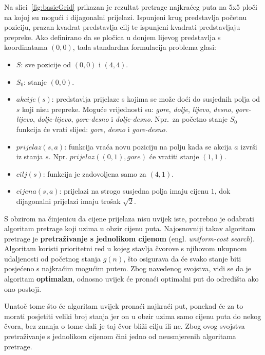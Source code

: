 \documentclass[times, utf8, zavrsni, numeric]{fer}
\begin{document}
Na slici~\ref{fig:basicGrid} prikazan je rezultat pretrage najkraćeg puta na 5x5 ploči na kojoj su mogući i dijagonalni prijelazi.
Ispunjeni krug predstavlja početnu poziciju, prazan kvadrat predstavlja cilj te ispunjeni kvadrati predstavljaju prepreke.
Ako definirano da se pločica u donjem lijevog predstavlja s koordinatama \((0, 0)\), tada standardna formulacija problema glasi:
\begin{itemize}
    \item \(S\): sve pozicije od \((0, 0)\) i \((4, 4)\).
    \item \(S_0\): stanje \((0, 0)\).
    \item \(akcije(s)\): predstavlja prijelaze s kojima se može doći do susjednih polja od \(s\) koji nisu prepreke. 
    Moguće vrijednosti su: \textit{gore}, \textit{dolje}, \textit{lijevo}, \textit{desno}, \textit{gore-lijevo}, \textit{dolje-lijevo}, \textit{gore-desno} i \textit{dolje-desno}. 
    Npr.\ za početno stanje \(S_0\) funkcija će vrati slijed: \textit{gore}, \textit{desno} i \textit{gore-desno}. 
    \item \(prijelaz(s, a)\): funkcija vraća novu poziciju na polju kada se akcija \(a\) izvrši iz stanja \(s\). Npr. \(prijelaz((0, 1), gore)\) će vratiti stanje \((1, 1)\).
    \item \(cilj(s)\): funkcija je zadovoljena samo za \((4, 1)\).
    \item \(cijena(s, a)\): prijelazi na strogo susjedna polja imaju cijenu \(1\), dok dijagonalni prijelazi imaju trošak \(\sqrt{2}\).
\end{itemize}

\par S obzirom na činjenicu da cijene prijelaza nisu uvijek iste, potrebno je odabrati algoritam pretrage koji uzima u obzir cijenu puta.
Najosnovniji takav algoritam pretrage je \textbf{pretraživanje s jednolikom cijenom} (engl. \textit{uniform-cost search}). 
Algoritam koristi prioritetni red u kojeg stavlja čvorove s njihovom ukupnom udaljenosti od početnog stanja \(g(n)\), što osigurava da će svako stanje biti posjećeno s najkraćim mogućim putem.
Zbog navedenog svojstva, vidi se da je algoritam \textbf{optimalan}, odnosno uvijek će pronaći optimalni put do odredišta ako ono postoji.

\par Unatoč tome što će algoritam uvijek pronaći najkraći put, ponekad će za to morati posjetiti veliki broj stanja jer on u obzir uzima samo cijenu puta do nekog čvora, bez znanja o tome dali je taj čvor bliži cilju ili ne. 
Zbog ovog svojstva pretraživanje s jednolikom cijenom čini jedno od neusmjerenih algoritama pretrage.
\end{document}
